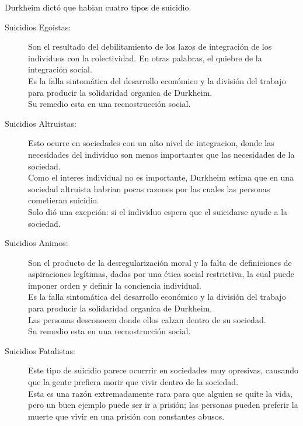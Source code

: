 Durkheim dict\'o que habian cuatro tipos de suicidio.
\begin{description}
	\item[Suicidios Egoistas:]
		Son el resultado del debilitamiento de los lazos de integraci\'on de los individuos con la colectividad. En otras palabras, el quiebre de la integraci\'on social.\\
		Es la falla sintom\'atica del desarrollo econ\'omico y la divisi\'on del trabajo para producir la solidaridad organica de Durkheim.\\
		Su remedio esta en una recnostrucci\'on social.
	\item[Suicidios Altruistas:]
		Esto ocurre en sociedades con un alto nivel de integracion, donde las necesidades del individuo son menos importantes que las necesidades de la sociedad.\\
		Como el interes individual no es importante, Durkheim estima que en una sociedad altruista habrian pocas razones por las cuales las personas cometieran suicidio.\\
		Solo di\'o una exepci\'on: si el individuo espera que el suicidarse ayude a la sociedad.
	\item[Suicidios Animos:]
		Son el producto de la desregularizaci\'on moral y la falta de definiciones de aspiraciones leg\'itimas, dadas por una \'etica social restrictiva, la cual puede imponer orden y definir la conciencia individual.\\
		Es la falla sintom\'atica del desarrollo econ\'omico y la divisi\'on del trabajo para producir la solidaridad organica de Durkheim.\\
		Las personas desconocen donde ellos calzan dentro de su sociedad. \\
		Su remedio esta en una recnostrucci\'on social.
	\item[Suicidios Fatalistas:]
		Este tipo de suicidio parece ocurrrir en sociedades muy opresivas, causando que la gente prefiera morir que vivir dentro de la sociedad.\\
		Esta es una raz\'on extremadamente rara para que alguien se quite la vida, pero un buen ejemplo puede ser ir a prisi\'on; las personas pueden preferir la muerte que vivir en una prisi\'on con constantes abusos.
\end{description}

